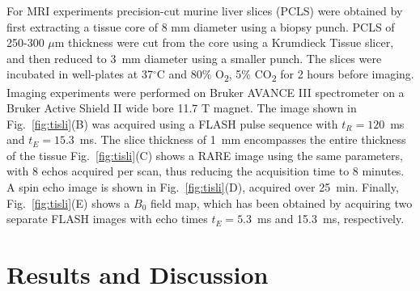 \documentclass[preprint,5p]{elsarticle}
\newcommand{\fig}[1]{Fig.~\ref{#1}}
\begin{document}
For MRI experiments precision-cut murine liver slices (PCLS) were obtained by first extracting a
tissue core of 8 mm diameter using a biopsy punch. PCLS of 250-300 $\mu$m
thickness were cut from the core using a Krumdieck Tissue slicer, and then
reduced to 3~mm diameter using a smaller punch. The slices were incubated in
well-plates at 37$^\circ$C and 80\% O\textsubscript{2}, 5\% CO\textsubscript{2}
for 2 hours before imaging. Imaging experiments were performed on Bruker
AVANCE III spectrometer on a Bruker Active Shield II wide bore 11.7 T magnet. The image shown in \fig{fig:tisli}(B) was acquired using a FLASH pulse sequence with $t_R=120$~ms and $t_E=15.3$~ms. The slice thickness of  1~mm encompasses the entire thickness of the tissue \fig{fig:tisli}(C) shows a
RARE image using the same parameters, with 8 echos acquired per scan, thus
reducing the acquisition time to 8 minutes. A spin echo image is shown in
\fig{fig:tisli}(D), acquired over 25~min. Finally, \fig{fig:tisli}(E) shows a
$B_0$ field map, which has been obtained by acquiring two separate FLASH images
with echo times $t_E=5.3$~ms and 15.3~ms, respectively.
\cbend


\section{Results and Discussion}
\end{document}
